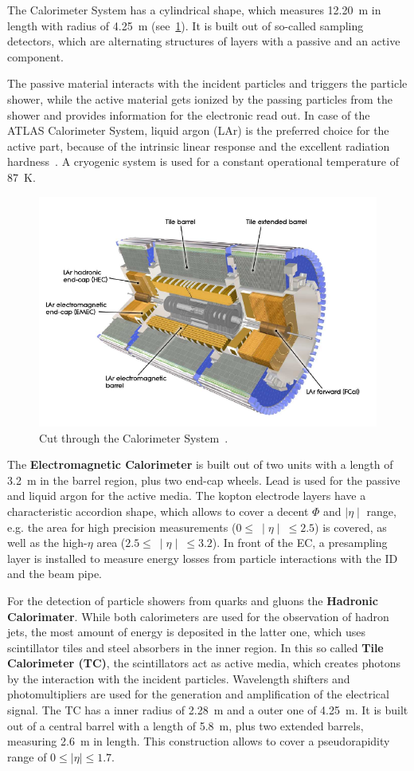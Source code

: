 The Calorimeter System has a  cylindrical shape, which measures 12.20~m in length with radius of 4.25~m (see~\cref{fig:35}). It is built out of so-called sampling detectors, which are alternating structures of layers with a passive and an active component.

 The passive material interacts with the incident particles and triggers the particle shower, while the active material gets ionized by the passing particles from the shower and provides information for the electronic read out. In case of the ATLAS Calorimeter System, liquid argon (LAr) is the preferred choice for the active part, because of the intrinsic linear response and the excellent radiation hardness~\cite{Aad:2008zzm}. A cryogenic system is used for a constant operational temperature of 87~K.


\begin{figure}[h]
	\centering
	\includegraphics[width=0.65\linewidth]{Pics/cp3/35}
	\caption{Cut through the Calorimeter  System~\cite{Aad:2008zzm}.} 
	\label{fig:35}
	\end{figure}



 The \textbf{Electromagnetic Calorimeter} is built out of two units with a length of 3.2~m in the barrel region, plus two end-cap wheels. Lead is used for the passive and liquid argon for the active media. The kopton electrode layers have a characteristic accordion shape, which allows to cover a decent $\Phi$  and $\mid\eta\mid$ range, e.g. the area for high precision measurements  ($0 \leq~  \mid\eta\mid ~\leq 2.5$) is covered, as well as the high-$\eta$ area  ($2.5 \leq~ \mid\eta\mid~ \leq3.2$). In front of the EC, a presampling layer is installed to measure energy losses  from particle interactions with the ID and the beam pipe.




For the detection of particle showers from quarks and gluons the \textbf{Hadronic Calorimater}. While both calorimeters are used for the observation of hadron jets, the most amount of energy is deposited in the latter one, which uses scintillator tiles and steel absorbers in the inner region. In this so called \textbf{Tile Calorimeter (TC)}, the scintillators act as active media, which creates photons by the interaction with the incident particles. Wavelength shifters and photomultipliers are  used for the generation and amplification of the electrical signal. The TC has a inner radius of 2.28~m and a outer one of 4.25~m. It is built out of a central barrel with a length of 5.8~m, plus two extended barrels, measuring 2.6~m in length. This construction  allows to cover a pseudorapidity range of $0 \leq \mid\eta\mid \leq1.7$.

